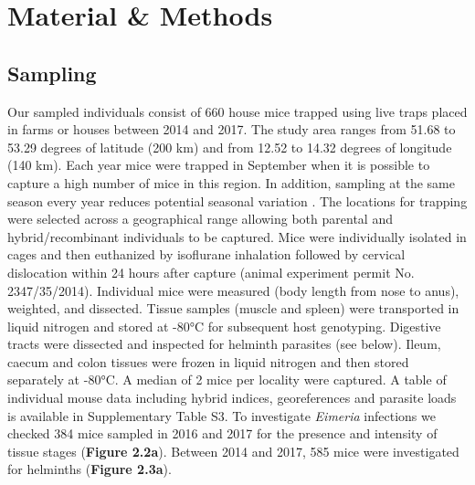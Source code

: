 \section{Material \&  Methods}
\subsection{Sampling}
Our sampled individuals consist of 660 house mice trapped using live traps placed in farms or houses between 2014 and 2017. The study area ranges from 51.68 to 53.29 degrees of latitude (200 km) and from 12.52 to 14.32 degrees of longitude (140 km). Each year mice were trapped in September when it is possible to capture a high number of mice in this region. In addition, sampling at the same season every year reduces potential seasonal variation \citep{abu-madi_seasonal_2000, haukisalmi_population_1988}. The locations for trapping were selected across a geographical range allowing both parental and hybrid/recombinant individuals to be captured. Mice were individually isolated in cages and then euthanized by isoflurane inhalation followed by cervical dislocation within 24 hours after capture (animal experiment permit No. 2347/35/2014). Individual mice were measured (body length from nose to anus), weighted, and dissected. Tissue samples (muscle and spleen) were transported in liquid nitrogen and stored at -80°C for subsequent host genotyping. Digestive tracts were dissected and inspected for helminth parasites (see below). Ileum, caecum and colon tissues were frozen in liquid nitrogen and then stored separately at -80°C. A median of 2 mice per locality were captured. A table of individual mouse data including hybrid indices, georeferences and parasite loads is available in Supplementary Table S3. To investigate \textit{Eimeria} infections we checked 384 mice sampled in 2016 and 2017 for the presence and intensity of tissue stages (\textbf{Figure 2.2a}). Between 2014 and 2017, 585 mice were investigated for helminths (\textbf{Figure 2.3a}). 

